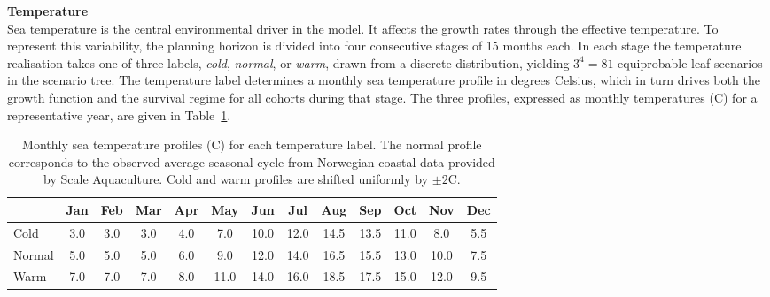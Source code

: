 \documentclass[12pt,a4paper]{article}
\begin{document}
\noindent \textbf{Temperature} \\
Sea temperature is the central environmental driver in the model. It affects the growth rates through the effective temperature. To represent this variability, the planning horizon is divided into four consecutive stages of 15 months each. In each stage the temperature realisation takes one of three labels, \emph{cold}, \emph{normal}, or \emph{warm}, drawn from a discrete distribution, yielding $3^4 = 81$ equiprobable leaf scenarios in the scenario tree. The temperature label determines a monthly sea temperature profile in degrees Celsius, which in turn drives both the growth function and the survival regime for all cohorts during that stage. The three profiles, expressed as monthly temperatures (\textdegree C) for a representative year, are given in Table~\ref{tab:temp_profiles}.
\begin{table}[ht]
\centering
\small
\begin{tabular}{l*{12}{c}}
\toprule
 & Jan & Feb & Mar & Apr & May & Jun & Jul & Aug & Sep & Oct & Nov & Dec \\
\midrule
Cold   & 3.0 & 3.0 & 3.0 & 4.0 & 7.0  & 10.0 & 12.0 & 14.5 & 13.5 & 11.0 & 8.0  & 5.5 \\
Normal & 5.0 & 5.0 & 5.0 & 6.0 & 9.0  & 12.0 & 14.0 & 16.5 & 15.5 & 13.0 & 10.0 & 7.5 \\
Warm   & 7.0 & 7.0 & 7.0 & 8.0 & 11.0 & 14.0 & 16.0 & 18.5 & 17.5 & 15.0 & 12.0 & 9.5 \\
\bottomrule
\end{tabular}
\caption{Monthly sea temperature profiles (\textdegree C) for each temperature label. The normal profile corresponds to the observed average seasonal cycle from Norwegian coastal data provided by Scale Aquaculture. Cold and warm profiles are shifted uniformly by $\pm 2$\textdegree C.}
\label{tab:temp_profiles}
\end{table}
 
\end{document}
